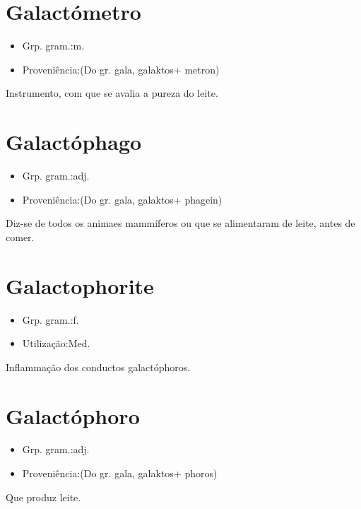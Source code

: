 \section{Galactómetro}
\begin{itemize}
\item {Grp. gram.:m.}
\end{itemize}
\begin{itemize}
\item {Proveniência:(Do gr. \textunderscore gala\textunderscore , \textunderscore galaktos\textunderscore  + \textunderscore metron\textunderscore )}
\end{itemize}
Instrumento, com que se avalia a pureza do leite.
\section{Galactóphago}
\begin{itemize}
\item {Grp. gram.:adj.}
\end{itemize}
\begin{itemize}
\item {Proveniência:(Do gr. \textunderscore gala\textunderscore , \textunderscore galaktos\textunderscore  + \textunderscore phagein\textunderscore )}
\end{itemize}
Diz-se de todos os animaes mammíferos ou que se alimentaram de leite, antes de comer.
\section{Galactophorite}
\begin{itemize}
\item {Grp. gram.:f.}
\end{itemize}
\begin{itemize}
\item {Utilização:Med.}
\end{itemize}
Inflammação dos conductos galactóphoros.
\section{Galactóphoro}
\begin{itemize}
\item {Grp. gram.:adj.}
\end{itemize}
\begin{itemize}
\item {Proveniência:(Do gr. \textunderscore gala\textunderscore , \textunderscore galaktos\textunderscore  + \textunderscore phoros\textunderscore )}
\end{itemize}
Que produz leite.
